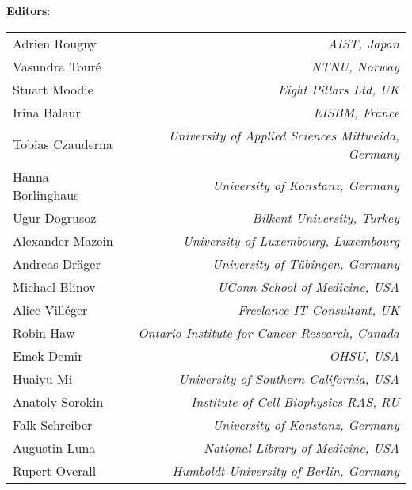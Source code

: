 \begin{titlepage}
\begin{center}
\vspace{0.5in}
\textbf{\sffamily Editors}:\\[7pt]
% 
% 
\begin{tabular}{l>{\hspace*{15pt}}r}
Adrien Rougny   & \emph{AIST, Japan}\\
Vasundra Touré   & \emph{NTNU, Norway}\\
Stuart Moodie   & \emph{Eight Pillars Ltd, UK}\\
Irina Balaur & \emph{EISBM, France}\\
Tobias Czauderna   & \emph{University of Applied Sciences Mittweida, Germany}\\
Hanna Borlinghaus & \emph{University of Konstanz, Germany}\\
Ugur Dogrusoz   & \emph{Bilkent University, Turkey}\\
Alexander Mazein   & \emph{University of Luxembourg, Luxembourg}\\
Andreas Dräger   & \emph{University of Tübingen, Germany}\\
Michael Blinov & \emph{UConn School of Medicine, USA}\\
Alice Vill\'{e}ger   & \emph{Freelance IT Consultant, UK}\\
Robin Haw   & \emph{Ontario Institute for Cancer Research, Canada}\\
Emek Demir    & \emph{OHSU, USA}\\
Huaiyu Mi	& \emph{University of Southern California, USA}\\
Anatoly Sorokin   & \emph{Institute of Cell Biophysics RAS, RU}\\ 
Falk Schreiber	 & \emph{University of Konstanz, Germany}\\
Augustin Luna   & \emph{National Library of Medicine, USA}\\
Rupert Overall   & \emph{Humboldt University of Berlin, Germany}\\
\end{tabular}


\end{center}
\end{titlepage}
